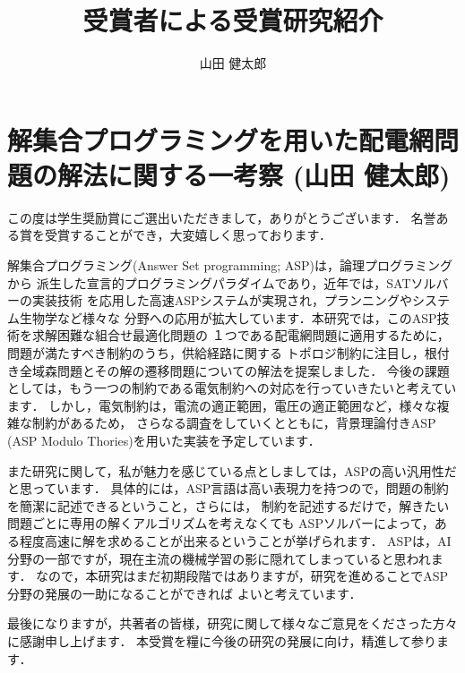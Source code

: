 \documentclass[T]{compsoft}
\begin{document}
\title{受賞者による受賞研究紹介}

%
\author{山田 健太郎}

\maketitle \thispagestyle {empty}

\section{解集合プログラミングを用いた配電網問題の解法に関する一考察 (山田 健太郎)}
この度は学生奨励賞にご選出いただきまして，ありがとうございます．
名誉ある賞を受賞することができ，大変嬉しく思っております．

解集合プログラミング(Answer Set programming; ASP)は，論理プログラミングから
派生した宣言的プログラミングパラダイムであり，近年では，SATソルバーの実装技術
を応用した高速ASPシステムが実現され，プランニングやシステム生物学など様々な
分野への応用が拡大しています．本研究では，このASP技術を求解困難な組合せ最適化問題の
１つである配電網問題に適用するために，問題が満たすべき制約のうち，供給経路に関する
トポロジ制約に注目し，根付き全域森問題とその解の遷移問題についての解法を提案しました．
今後の課題としては，もう一つの制約である電気制約への対応を行っていきたいと考えています．
しかし，電気制約は，電流の適正範囲，電圧の適正範囲など，様々な複雑な制約があるため，
さらなる調査をしていくとともに，背景理論付きASP (ASP Modulo Thories)を用いた実装を予定しています．


また研究に関して，私が魅力を感じている点としましては，ASPの高い汎用性だと思っています．
具体的には，ASP言語は高い表現力を持つので，問題の制約を簡潔に記述できるということ，さらには，
制約を記述するだけで，解きたい問題ごとに専用の解くアルゴリズムを考えなくても
ASPソルバーによって，ある程度高速に解を求めることが出来るということが挙げられます．
ASPは，AI分野の一部ですが，現在主流の機械学習の影に隠れてしまっていると思われます．
なので，本研究はまだ初期段階ではありますが，研究を進めることでASP分野の発展の一助になることができれば
よいと考えています．

最後になりますが，共著者の皆様，研究に関して様々なご意見をくださった方々に感謝申し上げます．
本受賞を糧に今後の研究の発展に向け，精進して参ります．
\end{document}
